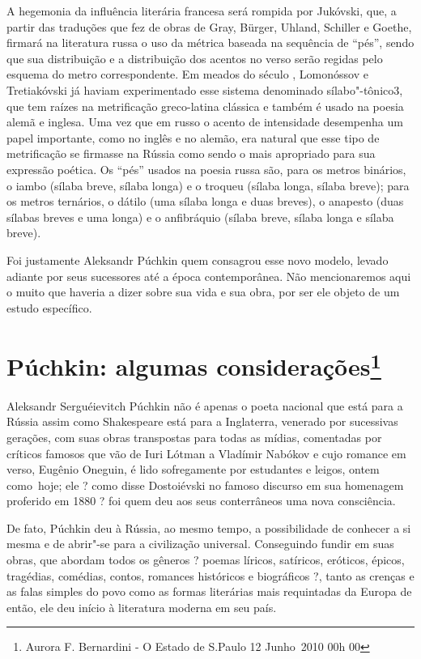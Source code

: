 A hegemonia da influência literária francesa será rompida por Jukóvski,
que, a partir das traduções que fez de obras de Gray, Bürger, Uhland,
Schiller e Goethe, firmará na literatura russa o uso da métrica baseada
na sequência de ``pés'', sendo que sua distribuição e a distribuição dos
acentos no verso serão regidas pelo esquema do metro correspondente. Em
meados do século , Lomonóssov e Tretiakóvski já haviam
experimentado esse sistema denomina­do sílabo"-tônico3, que tem raízes na
metrificação greco-latina clássica e tam­bém é usado na poesia alemã e
inglesa. Uma vez que em russo o acento de intensidade desempenha um
papel importante, como no inglês e no alemão, era natural que esse tipo
de metrificação se firmasse na Rússia como sendo o mais apropriado para
sua expressão poética. Os ``pés'' usados na poesia russa são, para os
metros binários, o iambo (sílaba breve, sílaba longa) e o troqueu
(sílaba longa, sílaba breve); para os metros ternários, o dátilo (uma
sílaba lon­ga e duas breves), o anapesto (duas sílabas breves e uma
longa) e o anfibráquio (sílaba breve, sílaba longa e sílaba breve).

Foi justamente Aleksandr Púchkin quem consagrou esse novo modelo, levado
adiante por seus sucessores até a época contemporânea. Não mencionaremos
aqui o muito que haveria a dizer sobre sua vida e sua obra, por ser ele
objeto de um estudo específico.

\chapter{Púchkin: algumas considerações\footnote{Aurora F. Bernardini -
  O Estado de S.Paulo 12 Junho~2010 \textbar{} 00h 00}}

Aleksandr Serguéievitch Púchkin não é apenas o poeta nacional que está
para a Rússia assim como Shakespeare está para a Inglaterra, venerado
por sucessivas gerações, com suas obras transpostas para todas as
mídias, comentadas por críticos famosos que vão de Iuri Lótman a
Vladímir Nabókov e cujo romance em verso, Eugênio Oneguin, é lido
sofregamente por estudantes e leigos, ontem como~hoje; ele ? como disse
Dostoiévski no famoso discurso em sua homenagem proferido em 1880 ? foi
quem deu aos seus conterrâneos uma nova consciência.

De fato, Púchkin deu à Rússia, ao mesmo tempo, a possibilidade de
conhecer a si mesma e de abrir"-se para a civilização universal.
Conseguindo fundir em suas obras, que abordam todos os gêneros ? poemas
líricos, satíricos, eróticos, épicos, tragédias, comédias, contos,
romances históricos e biográficos ?, tanto as crenças e as falas simples
do povo como as formas literárias mais requintadas da Europa de então,
ele deu início à literatura moderna em seu país.

